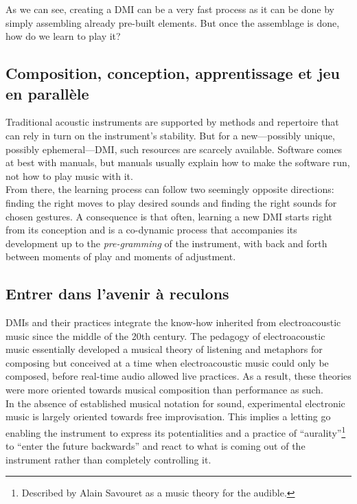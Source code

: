 As we can see, creating a DMI can be a very fast process as it can be done by simply assembling already pre-built elements. But once the assemblage is done, how do we learn to play it?

\subsection{Composition, conception, apprentissage et jeu en parallèle}

\indent Traditional acoustic instruments are supported by methods and repertoire that can rely in turn on the instrument's stability. But for a new—possibly unique, possibly ephemeral—DMI, such resources are scarcely available. Software comes at best with manuals, but manuals usually explain how to make the software run, not how to play music with it.\\
\indent From there, the learning process can follow two seemingly opposite directions: finding the right moves to play desired sounds and finding the right sounds for chosen gestures. A consequence is that often, learning a new DMI starts right from its conception and is a co-dynamic process that accompanies its development up to the \textit{pre-gramming} of the instrument, with back and forth between moments of play and moments of adjustment.

\subsection{Entrer dans l'avenir à reculons}

DMIs and their practices integrate the know-how inherited from electroacoustic music since the middle of the 20th century. The pedagogy of electroacoustic music essentially developed a musical theory of listening \cite{schaeffer_traite_1966} and metaphors for composing \cite{bayle_musique_1993} but conceived at a time when electroacoustic music could only be composed, before real-time audio allowed live practices. As a result, these theories were more oriented towards musical composition than performance as such.\\
\indent In the absence of established musical notation for sound, experimental electronic music is largely oriented towards free improvisation. This implies a letting go enabling the instrument to express its potentialities and a practice of “aurality”\footnote{Described by Alain Savouret as a music theory for the audible.} to “enter the future backwards” \cite{savouret_introduction_2010} and react to what is coming out of the instrument rather than completely controlling it.
	
